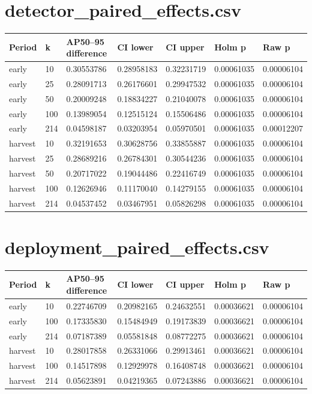 \documentclass{article}
\begin{document}
\section*{detector\_paired\_effects.csv}
\begin{lrbox}{\resulttable}\begin{tabular}{lllllll}
\toprule
Period & k & AP50--95 difference & CI lower & CI upper & Holm p & Raw p \\
\midrule
early & 10 & 0.30553786 & 0.28958183 & 0.32231719 & 0.00061035 & 0.00006104 \\
early & 25 & 0.28091713 & 0.26176601 & 0.29947532 & 0.00061035 & 0.00006104 \\
early & 50 & 0.20009248 & 0.18834227 & 0.21040078 & 0.00061035 & 0.00006104 \\
early & 100 & 0.13989054 & 0.12515124 & 0.15506486 & 0.00061035 & 0.00006104 \\
early & 214 & 0.04598187 & 0.03203954 & 0.05970501 & 0.00061035 & 0.00012207 \\
harvest & 10 & 0.32191653 & 0.30628756 & 0.33855887 & 0.00061035 & 0.00006104 \\
harvest & 25 & 0.28689216 & 0.26784301 & 0.30544236 & 0.00061035 & 0.00006104 \\
harvest & 50 & 0.20717022 & 0.19044486 & 0.22416749 & 0.00061035 & 0.00006104 \\
harvest & 100 & 0.12626946 & 0.11170040 & 0.14279155 & 0.00061035 & 0.00006104 \\
harvest & 214 & 0.04537452 & 0.03467951 & 0.05826298 & 0.00061035 & 0.00006104 \\
\bottomrule
\end{tabular}\end{lrbox}
\noindent\ifdim\wd\resulttable>\linewidth\resizebox{.99\linewidth}{!}{\usebox{\resulttable}}\else\usebox{\resulttable}\fi
\clearpage
\section*{deployment\_paired\_effects.csv}
\begin{lrbox}{\resulttable}\begin{tabular}{lllllll}
\toprule
Period & k & AP50--95 difference & CI lower & CI upper & Holm p & Raw p \\
\midrule
early & 10 & 0.22746709 & 0.20982165 & 0.24632551 & 0.00036621 & 0.00006104 \\
early & 100 & 0.17335830 & 0.15484949 & 0.19173839 & 0.00036621 & 0.00006104 \\
early & 214 & 0.07187389 & 0.05581848 & 0.08772275 & 0.00036621 & 0.00006104 \\
harvest & 10 & 0.28017858 & 0.26331066 & 0.29913461 & 0.00036621 & 0.00006104 \\
harvest & 100 & 0.14517898 & 0.12929978 & 0.16408748 & 0.00036621 & 0.00006104 \\
harvest & 214 & 0.05623891 & 0.04219365 & 0.07243886 & 0.00036621 & 0.00006104 \\
\bottomrule
\end{tabular}\end{lrbox}
\noindent\ifdim\wd\resulttable>\linewidth\resizebox{.99\linewidth}{!}{\usebox{\resulttable}}\else\usebox{\resulttable}\fi
\clearpage
\end{document}
